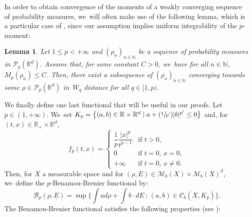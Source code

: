 \documentclass[11pt]{article}
\numberwithin{equation}{section}
\newcommand{\Psfrac}[2]{(\sfrac{#1}{#2})}
\def\NN{\mathbb{N}}
\def\RR{\mathbb{R}}
\def\calB{{\mathcal B}}
\def\calC{{\mathcal C}}
\def\calM{{\mathcal M}}
\def\calP{{\mathcal P}}
\theoremstyle{plain}
\newtheorem{lemma}[theorem]{Lemma}
\theoremstyle{definition}
\begin{document}
In order to obtain convergence of the moments of a weakly converging sequence of probability measures, we~will often make use of the following lemma, which is a particular case of \cite[Prop.\,7.1.5]{ambrosio08}, since our assumption implies uniform integrability of the $p$-moment:
\begin{lemma}\label{lemma:boundedWpImpliesCompactWq}
Let $1 \leq p < +\infty$ and $(\rho_n)_{n \in \NN}$ be a sequence of probability measures in $\calP_p(\RR^d)$.
Assume that, for some constant $C>0$, we~have for all $n \in \NN$, $M_p(\rho_n) \leq C$.
Then, there exist a subsequence of $(\rho_n)_{n \in \NN}$ converging towards some $\rho \in \calP_p(\RR^d)$ in~$W_q$ distance for all $q \in [1,p)$.
\end{lemma}

We finally define one last functional that will be useful in our proofs. Let $p \in (1, +\infty)$. We~set $K_p = \bigl\lbrace (a,b) \in \RR \times \RR^d \mid a + \Psfrac{1}{p'} |b|^{p'} \leq 0 \bigr\rbrace$ and, for $(t,x) \in \RR_+ \times \RR^d$,
\[
f_p(t,x) = \begin{cases}
\dfrac{1}{p} \dfrac{|x|^p}{t^{p-1}} & \text{if } t>0, \\
0 & \text{if } t=0, \, x=0, \\
+\infty & \text{if } t=0, \, x \neq 0.
\end{cases}
\]
Then, for $X$ a measurable space and for $(\rho, E) \in \calM_b(X) \times \calM_b(X)^d$, we~define the $p$-Benamou-Brenier functional by:
\[
\calB_p(\rho, E) = \sup \biggl\lbrace \int a d\rho + \int b \cdot dE \,; \, (a,b) \in \calC_b(X, K_p) \biggr\rbrace.
\]
The Benamou-Brenier functional satisfies the following properties (see \cite[Prop.\,5.18]{otam15}):
\end{document}
